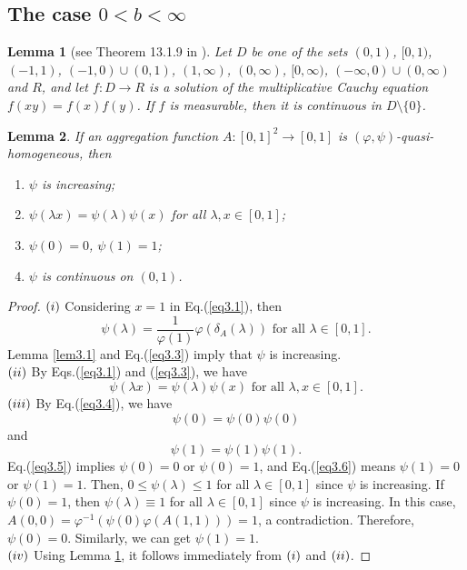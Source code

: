 \documentclass[12pt]{article}
\newtheorem{lemma}{\bf Lemma}[section]
\begin{document}
\subsection{The case $0<b<\infty$}
\begin{lemma}[see Theorem 13.1.9 in \cite{Kuczma1985}]\label{lem2.2}
Let $D$ be one of the sets $(0, 1)$, $[0, 1)$, $(-1, 1)$, $(-1, 0)\cup (0, 1)$, $(1, \infty)$, $(0, \infty)$, $[0, \infty)$, $(-\infty, 0)\cup (0, \infty)$ and $R$, and let $f:D\rightarrow R$ is a solution of the multiplicative Cauchy equation $f(xy) = f(x)f(y)$. If $f$ is measurable, then it is continuous in $D\setminus\{0\}$.
\end{lemma}
\begin{lemma}\label{lem3.2}
If an aggregation function $A:[0, 1]^2\rightarrow[0, 1]$ is $(\varphi, \psi)$-quasi-homogeneous, then
\begin{enumerate}
\item [(\romannumeral 1)] $\psi$ is increasing;
\item [(\romannumeral 2)] $\psi(\lambda x)=\psi(\lambda)\psi(x)$ for all $\lambda, x\in[0, 1]$;
\item [(\romannumeral 3)] $\psi(0)=0$, $\psi(1)=1$;
\item [(\romannumeral 4)] $\psi$ is continuous on $(0,1)$.
\end{enumerate}
\end{lemma}
\begin{proof}
$(\romannumeral 1)$ Considering $x=1$ in Eq.(\ref{eq3.1}), then
\begin{equation}\label{eq3.3}
\psi(\lambda)=\frac{1}{\varphi(1)}\varphi(\delta_{A}(\lambda))\mbox{ for all } \lambda \in[0, 1].
 \end{equation}
Lemma \ref{lem3.1} and Eq.(\ref{eq3.3}) imply that $\psi$ is increasing.\\
$(\romannumeral 2)$ By Eqs.(\ref{eq3.1}) and (\ref{eq3.3}), we have
 \begin{equation}\label{eq3.4}
\psi(\lambda x)=\psi(\lambda)\psi(x)\mbox{ for all } \lambda, x\in[0, 1].
 \end{equation}
$(\romannumeral 3)$ By Eq.(\ref{eq3.4}), we have
\begin{equation}\label{eq3.5}
\psi(0)=\psi(0)\psi(0)
\end{equation}
and
\begin{equation}\label{eq3.6}
\psi(1)=\psi(1)\psi(1).
\end{equation}
Eq.(\ref {eq3.5}) implies $\psi(0)=0$ or $\psi(0)=1$,
and
Eq.(\ref{eq3.6}) means $\psi(1)=0$ or $\psi(1)=1$. Then, $0\leq\psi(\lambda)\leq1$ for all $\lambda\in[0, 1]$ since $\psi$ is increasing.
If $\psi(0)=1$, then $\psi(\lambda)\equiv1$ for all $\lambda\in[0, 1]$ since $\psi$ is increasing. In this case, $A(0, 0)=\varphi^{-1}(\psi(0)\varphi(A(1, 1)))=1$, a contradiction.
Therefore, $\psi(0)=0$. Similarly, we can get $\psi(1)=1$.\\
$(\romannumeral 4)$
Using Lemma \ref{lem2.2}, it follows immediately from $(\romannumeral 1)$ and $(\romannumeral 2)$.
\end{proof}
\end{document}

